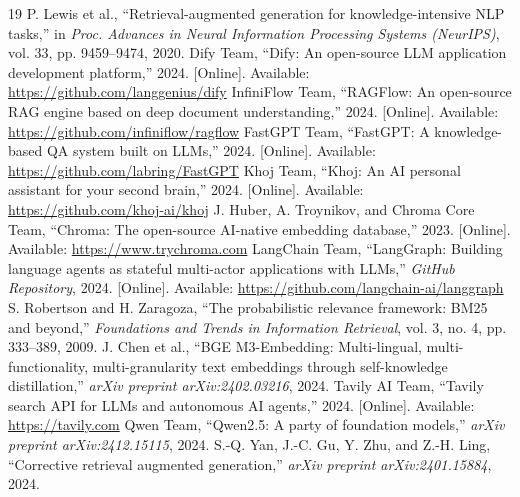 \documentclass[conference]{IEEEtran}
\begin{document}
\begin{thebibliography}{19}
 P. Lewis et al., ``Retrieval-augmented generation for knowledge-intensive NLP tasks,'' in \textit{Proc. Advances in Neural Information Processing Systems (NeurIPS)}, vol. 33, pp. 9459--9474, 2020.
 Dify Team, ``Dify: An open-source LLM application development platform,'' 2024. [Online]. Available: \url{https://github.com/langgenius/dify}
 InfiniFlow Team, ``RAGFlow: An open-source RAG engine based on deep document understanding,'' 2024. [Online]. Available: \url{https://github.com/infiniflow/ragflow}
 FastGPT Team, ``FastGPT: A knowledge-based QA system built on LLMs,'' 2024. [Online]. Available: \url{https://github.com/labring/FastGPT}
 Khoj Team, ``Khoj: An AI personal assistant for your second brain,'' 2024. [Online]. Available: \url{https://github.com/khoj-ai/khoj}
 J. Huber, A. Troynikov, and Chroma Core Team, ``Chroma: The open-source AI-native embedding database,'' 2023. [Online]. Available: \url{https://www.trychroma.com}
 LangChain Team, ``LangGraph: Building language agents as stateful multi-actor applications with LLMs,'' \textit{GitHub Repository}, 2024. [Online]. Available: \url{https://github.com/langchain-ai/langgraph}
 S. Robertson and H. Zaragoza, ``The probabilistic relevance framework: BM25 and beyond,'' \textit{Foundations and Trends in Information Retrieval}, vol. 3, no. 4, pp. 333--389, 2009.
 J. Chen et al., ``BGE M3-Embedding: Multi-lingual, multi-functionality, multi-granularity text embeddings through self-knowledge distillation,'' \textit{arXiv preprint arXiv:2402.03216}, 2024.
 Tavily AI Team, ``Tavily search API for LLMs and autonomous AI agents,'' 2024. [Online]. Available: \url{https://tavily.com}
 Qwen Team, ``Qwen2.5: A party of foundation models,'' \textit{arXiv preprint arXiv:2412.15115}, 2024.
 S.-Q. Yan, J.-C. Gu, Y. Zhu, and Z.-H. Ling, ``Corrective retrieval augmented generation,'' \textit{arXiv preprint arXiv:2401.15884}, 2024.
\end{thebibliography}
\end{document}
